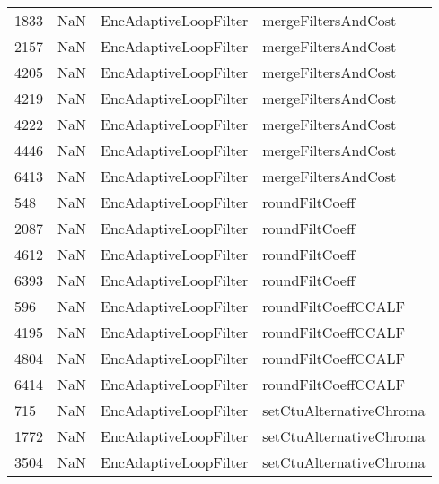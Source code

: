 \begin{tabular}{llll}
1833 &                   NaN &      EncAdaptiveLoopFilter &                       mergeFiltersAndCost \\
2157 &                   NaN &      EncAdaptiveLoopFilter &                       mergeFiltersAndCost \\
4205 &                   NaN &      EncAdaptiveLoopFilter &                       mergeFiltersAndCost \\
4219 &                   NaN &      EncAdaptiveLoopFilter &                       mergeFiltersAndCost \\
4222 &                   NaN &      EncAdaptiveLoopFilter &                       mergeFiltersAndCost \\
4446 &                   NaN &      EncAdaptiveLoopFilter &                       mergeFiltersAndCost \\
6413 &                   NaN &      EncAdaptiveLoopFilter &                       mergeFiltersAndCost \\
548  &                   NaN &      EncAdaptiveLoopFilter &                            roundFiltCoeff \\
2087 &                   NaN &      EncAdaptiveLoopFilter &                            roundFiltCoeff \\
4612 &                   NaN &      EncAdaptiveLoopFilter &                            roundFiltCoeff \\
6393 &                   NaN &      EncAdaptiveLoopFilter &                            roundFiltCoeff \\
596  &                   NaN &      EncAdaptiveLoopFilter &                       roundFiltCoeffCCALF \\
4195 &                   NaN &      EncAdaptiveLoopFilter &                       roundFiltCoeffCCALF \\
4804 &                   NaN &      EncAdaptiveLoopFilter &                       roundFiltCoeffCCALF \\
6414 &                   NaN &      EncAdaptiveLoopFilter &                       roundFiltCoeffCCALF \\
715  &                   NaN &      EncAdaptiveLoopFilter &                   setCtuAlternativeChroma \\
1772 &                   NaN &      EncAdaptiveLoopFilter &                   setCtuAlternativeChroma \\
3504 &                   NaN &      EncAdaptiveLoopFilter &                   setCtuAlternativeChroma \\

\end{tabular}
